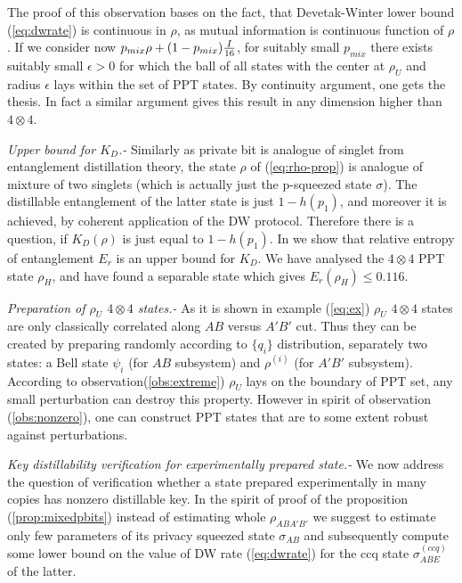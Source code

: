 \documentclass[twocolumn,prl,aps]{revtex4}
\def\ep{{\epsilon}}
\def\ot{\otimes}
\def\sigmaccqabe{\sigma^{(ccq)}_{ABE}}
\def\sigmaab{\sigma_{AB}}
\begin{document}
The proof of this observation bases on the fact, that Devetak-Winter 
lower bound (\ref{eq:dwrate}) is continuous in $\rho$,
as mutual information is continuous function of $\rho$. If we consider 
now $ p_{mix} \rho + (1-p_{mix}) {I\over 16}$,
for suitably small $p_{mix}$ there exists suitably small $\ep > 0$ 
for which the ball of all states with the center
at $\rho_U$ and radius $\ep$ lays within the set of PPT states. 
By continuity argument, one gets the thesis.
In fact a similar argument gives this result in any
dimension higher than $4\ot4$.

{\it  Upper  bound for $K_D$.-} Similarly as private bit is 
analogue of singlet from entanglement distillation theory, 
the state $\rho$ of (\ref{eq:rho-prop}) is analogue of mixture of two singlets 
(which is actually just the p-squeezed state $\sigma$).
The distillable entanglement of the latter state  is just $1-h(p_1)$, \cite{BDSW1996} and 
moreover it is achieved, by coherent application of the DW protocol. 
Therefore there is a question, if $K_D(\rho)$ is just equal to $1-h(p_1)$.
In \cite{pptkey,keyhuge} we show that relative entropy of entanglement $E_r$ 
is an upper bound for $K_D$. We have analysed the $4\ot 4$ 
PPT state $\rho_H$, and have found a separable state which 
gives $E_r(\rho_H)\leq 0.116$. 


{\it Preparation of $\rho_U$  $4\ot 4$ states.-}
As it is shown in example (\ref{eq:ex}) $\rho_U$ $4\ot 4$ states  
are only classically correlated along
$AB$ versus $A'B'$ cut. Thus they can be created by 
preparing randomly according to $\{q_i\}$ distribution, 
separately two states: a Bell state $\psi_i$ (for $AB$ subsystem) 
and $\rho^{(i)}$ (for $A'B'$ subsystem). 
According to observation(\ref{obs:extreme}) $\rho_U$ lays  
on the boundary of PPT set, any small perturbation can
destroy this property. However in spirit
of observation (\ref{obs:nonzero}), one can construct PPT 
states that are to some extent robust against perturbations. 

{\it Key distillability verification for experimentally prepared state.-}
	We now address the question of verification whether a state
 prepared experimentally in many copies has nonzero distillable key. 
 In the spirit of proof of the proposition (\ref{prop:mixedpbits}) instead of 
estimating whole $\rho_{ABA'B'}$  we suggest to estimate 
only few parameters of its privacy squeezed state $\sigmaab$ and subsequently 
compute some lower bound on the value of  DW rate (\ref{eq:dwrate}) for 
the ccq state $\sigmaccqabe$ of the latter. 
\end{document}
